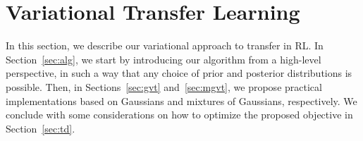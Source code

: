 \documentclass{article}
\begin{document}
%


\section{Variational Transfer Learning}

In this section, we describe our variational approach to transfer in RL. In Section~\ref{sec:alg}, we start by introducing our algorithm from a high-level perspective, in such a way that any choice of prior and posterior distributions is possible. Then, in Sections~\ref{sec:gvt} and~\ref{sec:mgvt}, we propose practical implementations based on Gaussians and mixtures of Gaussians, respectively. We conclude with some considerations on how to optimize the proposed objective in Section~\ref{sec:td}.
\end{document}
